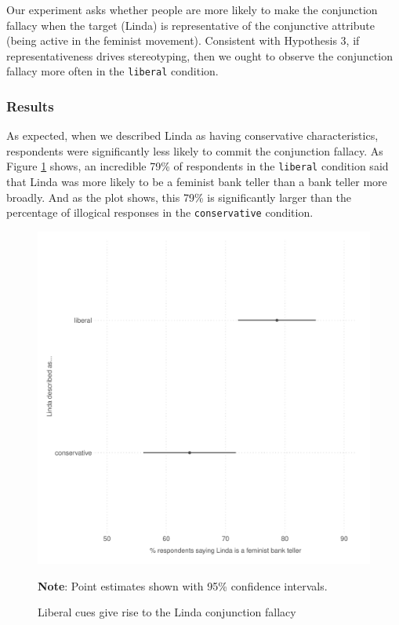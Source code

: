 \documentclass[12pt, letterpaper]{article}
\begin{document}
Our experiment asks whether people are more likely to make the conjunction fallacy when the target (Linda) is representative of the conjunctive attribute (being active in the feminist movement). Consistent with Hypothesis 3, if representativeness drives stereotyping, then we ought to observe the conjunction fallacy more often in the {\tt liberal} condition.

\subsubsection{Results}

As expected, when we described Linda as having conservative characteristics, respondents were significantly less likely to commit the conjunction fallacy. As Figure \ref{fig:linda} shows, an incredible 79\% of respondents in the {\tt liberal} condition said that Linda was more likely to be a feminist bank teller than a bank teller more broadly. And as the plot shows, this 79\% is significantly larger than the percentage of illogical responses in the {\tt conservative} condition.

\begin{figure}
\caption{Liberal cues give rise to the Linda conjunction fallacy}
\label{fig:linda}
\begin{center}
\includegraphics[width=1\textwidth]{../figs/fig_1_linda_gg.pdf}
\end{center}
\scriptsize{\textbf{Note}: Point estimates shown with 95\% confidence intervals.}
\end{figure}
\end{document}
